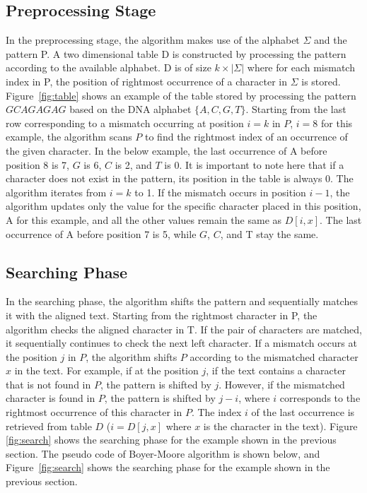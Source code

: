\documentclass[paper=a4, fontsize=11pt]{scrartcl} %
\numberwithin{equation}{section} %
\numberwithin{figure}{section} %
\numberwithin{table}{section} %
\begin{document}
\subsection{Preprocessing Stage}
In the preprocessing stage, the algorithm makes use of the alphabet $\Sigma$ and the pattern P. A two dimensional table D is constructed by processing the pattern according to the available alphabet. D is of size $k\times|\Sigma|$ where for each mismatch index in P, the position of rightmost occurrence of a character in $\Sigma$ is stored. Figure~\ref{fig:table} shows an example of the table stored by processing the pattern $GCAGAGAG$ based on the DNA alphabet $\{A,C,G,T\}$. Starting from the last row corresponding to a mismatch occurring at position $i=k$ in $P$, $i=8$ for this example, the algorithm scans $P$ to find the rightmost index of an occurrence of the given character. In the below example, the last occurrence of A before position 8 is 7, $G$ is 6, $C$ is 2, and $T$ is 0. It is important to note here that if a character does not exist in the pattern, its position in the table is always 0. The algorithm iterates from $i=k$ to 1. If the mismatch occurs in position $i-1$, the algorithm updates only the value for the specific character placed in this position, A for this example, and all the other values remain the same as $D[i,x]$. The last occurrence of A before position 7 is 5, while $G$, $C$, and T stay the same.

\subsection{Searching Phase}
In the searching phase, the algorithm shifts the pattern and sequentially matches it with the aligned text. Starting from the rightmost character in P, the algorithm checks the aligned character in T. If the pair of characters are matched, it sequentially continues to check the next left character. If a mismatch occurs at the position $j$ in $P$, the algorithm shifts $P$ according to the mismatched character $x$ in the text. For example, if at the position $j$, if the text contains a character that is not found in $P$, the pattern is shifted by $j$. However, if the mismatched character is found in $P$, the pattern is shifted by $j-i$, where $i$ corresponds to the rightmost occurrence of this character in $P$. The index $i$ of the last occurrence is retrieved from table $D$ ($i=D[j,x]$ where $x$ is the character in the text). Figure \ref{fig:search} shows the searching phase for the example shown in the previous section. The pseudo code of Boyer-Moore algorithm is shown below, and Figure~\ref{fig:search} shows the searching phase for the example shown in the previous section.
\end{document}
